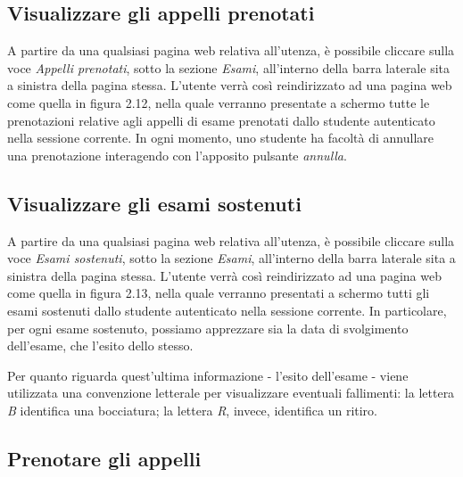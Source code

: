 \documentclass [a4paper,11pt]{book}
\begin{document}

\medskip

\subsection{Visualizzare gli appelli prenotati}

A partire da una qualsiasi pagina web relativa all'utenza, è possibile cliccare sulla voce \emph{Appelli prenotati}, sotto la sezione \emph{Esami}, all'interno della barra laterale sita a sinistra della pagina stessa. L'utente verrà così reindirizzato ad una pagina web come quella in figura 2.12, nella quale verranno presentate a schermo tutte le prenotazioni relative agli appelli di esame prenotati dallo studente autenticato nella sessione corrente. In ogni momento, uno studente ha facoltà di annullare una prenotazione interagendo con l'apposito pulsante \emph{annulla}.


\medskip

\subsection{Visualizzare gli esami sostenuti}

A partire da una qualsiasi pagina web relativa all'utenza, è possibile cliccare sulla voce \emph{Esami sostenuti}, sotto la sezione \emph{Esami}, all'interno della barra laterale sita a sinistra della pagina stessa. L'utente verrà così reindirizzato ad una pagina web come quella in figura 2.13, nella quale verranno presentati a schermo tutti gli esami sostenuti dallo studente autenticato nella sessione corrente. In particolare, per ogni esame sostenuto, possiamo apprezzare sia la data di svolgimento dell'esame, che l'esito dello stesso.

Per quanto riguarda quest'ultima informazione - l'esito dell'esame - viene utilizzata una convenzione letterale per visualizzare eventuali fallimenti: la lettera \emph{B} identifica una bocciatura; la lettera \emph{R}, invece, identifica un ritiro.


\medskip

\subsection{Prenotare gli appelli}
\end{document}
